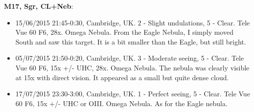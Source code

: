 {\bf M17, Sgr, CL+Neb}:
\begin{itemize}
\item 15/06/2015 21:45-0:30, Cambridge, UK. 2 - Slight undulations, 5 - Clear. Tele Vue 60 F6, 28x. Omega Nebula. From the Eagle Nebula, I simply moved South and saw this target. It is a bit smaller than the Eagle, but still bright. 
\item 05/07/2015 21:50-0:20, Cambridge, UK. 3 - Moderate seeing, 5 - Clear. Tele Vue 60 F6, 15x +/- UHC, 28x. Omega Nebula. The nebula was clearly visible at 15x with direct vision. It appeared as a small but quite dense cloud.
\item 17/07/2015 23:30-3:00, Cambridge, UK. 1 - Perfect seeing, 5 - Clear. Tele Vue 60 F6, 15x +/- UHC or OIII. Omega Nebula. As for the Eagle nebula.
\end{itemize}

